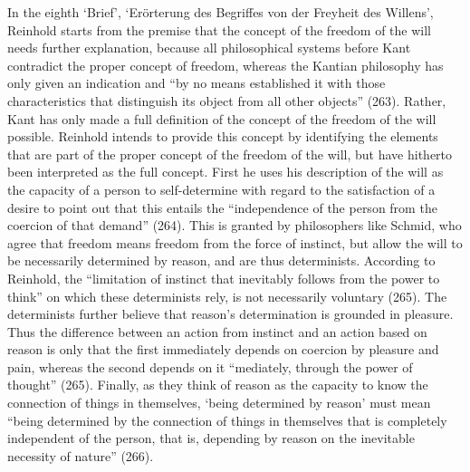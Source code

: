  In the eighth `Brief', `Er\"{o}rterung des Begriffes von der Freyheit des Willens', Reinhold starts from the premise that the concept of the freedom of the will needs further explanation, because all philosophical systems before Kant contradict the proper concept of freedom, whereas the Kantian philosophy has only given an indication and ``by no means established it with those characteristics that distinguish its object from all other objects'' (263). Rather, Kant has only made a full definition of the concept of the freedom of the will possible. Reinhold intends to provide this concept by identifying the elements that are part of the proper concept of the freedom of the will, but have hitherto been interpreted as the full concept. First he uses his description of the will as the capacity of a person to self{-}determine with regard to the satisfaction of a desire to point out that this entails the ``independence of the person from the coercion of that demand'' (264). This is granted by philosophers like Schmid, who agree that freedom means freedom from the force of instinct, but allow the will to be necessarily determined by reason, and are thus determinists. According to Reinhold, the ``limitation of instinct that inevitably follows from the power to think'' on which these determinists rely, is not necessarily voluntary (265). The determinists further believe that reason's determination is grounded in pleasure. Thus the difference between an action from instinct and an action based on reason is only that the first immediately depends on coercion by pleasure and pain, whereas the second depends on it ``mediately, through the power of thought'' (265). Finally, as they think of reason as the capacity to know the connection of things in themselves, `being determined by reason' must mean ``being determined by the connection of things in themselves that is completely independent of the person, that is, depending by reason on the inevitable necessity of nature'' (266). 

